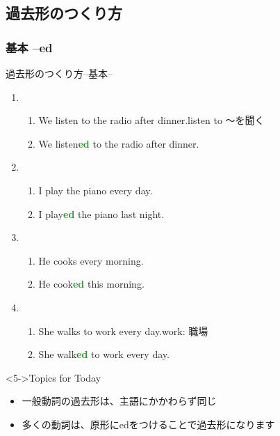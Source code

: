 \documentclass[aspectratio=169,xcolor={dvipsnames,table}]{beamer}
\newcommand{\myaudio}[1]{\href{#1}{\faVolumeUp}}
\begin{document}
\subsection{過去形のつくり方}
\subsubsection{基本 --ed}
\begin{frame}[plain]{過去形のつくり方--基本--}
 
\begin{enumerate}
 \item<1-> \begin{enumerate}
	\item We listen to the radio after dinner.\hfill{\scriptsize listen to ～を聞く\,}
	\item We listen\textcolor{ForestGreen}{\bfseries ed} to the radio after dinner.
       \end{enumerate}
 \item<2-> \begin{enumerate}
	\item I play the piano every day.
	\item I play\textcolor{ForestGreen}{\bfseries ed} the piano last night.
       \end{enumerate}
 \item<3-> \begin{enumerate}
	\item He cooks every morning.
	\item He cook\textcolor{ForestGreen}{\bfseries ed} this morning.
       \end{enumerate}

 \item<4-> \begin{enumerate}
	\item She walks to work every day.\hfill{}{\scriptsize work: 職場}
	\item She walk\textcolor{ForestGreen}{\bfseries ed} to work every day.
       \end{enumerate}
\end{enumerate}

\begin{exampleblock}<5->{Topics for Today}\small
\begin{itemize}
 \item 一般動詞の過去形は、主語にかかわらず同じ
 \item 多くの動詞は、原形にedをつけることで過去形になります
\end{itemize}
\end{exampleblock}
\hfill\myaudio{./audio/025_past_do_02.mp3}

\end{frame}
\end{document}
